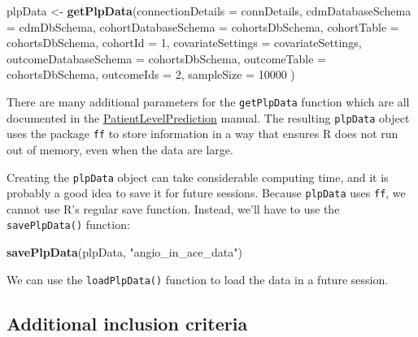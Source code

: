 \documentclass[11pt]{book}
\newenvironment{Shaded}{\begin{snugshade}}{\end{snugshade}}
\newcommand{\KeywordTok}[1]{\textcolor[rgb]{0.13,0.29,0.53}{\textbf{#1}}}
\newcommand{\DataTypeTok}[1]{\textcolor[rgb]{0.13,0.29,0.53}{#1}}
\newcommand{\DecValTok}[1]{\textcolor[rgb]{0.00,0.00,0.81}{#1}}
\newcommand{\StringTok}[1]{\textcolor[rgb]{0.31,0.60,0.02}{#1}}
\newcommand{\NormalTok}[1]{#1}
\begin{document}
\begin{Shaded}
\begin{Highlighting}[]
\NormalTok{plpData <-}\StringTok{ }\KeywordTok{getPlpData}\NormalTok{(}\DataTypeTok{connectionDetails =}\NormalTok{ connDetails,}
                      \DataTypeTok{cdmDatabaseSchema =}\NormalTok{ cdmDbSchema,}
                      \DataTypeTok{cohortDatabaseSchema =}\NormalTok{ cohortsDbSchema,}
                      \DataTypeTok{cohortTable =}\NormalTok{ cohortsDbSchema,}
                      \DataTypeTok{cohortId =} \DecValTok{1}\NormalTok{,}
                      \DataTypeTok{covariateSettings =}\NormalTok{ covariateSettings,}
                      \DataTypeTok{outcomeDatabaseSchema =}\NormalTok{ cohortsDbSchema,}
                      \DataTypeTok{outcomeTable =}\NormalTok{ cohortsDbSchema,}
                      \DataTypeTok{outcomeIds =} \DecValTok{2}\NormalTok{,}
                      \DataTypeTok{sampleSize =} \DecValTok{10000}
\NormalTok{)}
\end{Highlighting}
\end{Shaded}

There are many additional parameters for the \texttt{getPlpData}
function which are all documented in the
\href{https://ohdsi.github.io/PatientLevelPrediction/}{PatientLevelPrediction}
manual. The resulting \texttt{plpData} object uses the package
\texttt{ff} to store information in a way that ensures R does not run
out of memory, even when the data are large.

Creating the \texttt{plpData} object can take considerable computing
time, and it is probably a good idea to save it for future sessions.
Because \texttt{plpData} uses \texttt{ff}, we cannot use R's regular
save function. Instead, we'll have to use the \texttt{savePlpData()}
function:

\begin{Shaded}
\begin{Highlighting}[]
\KeywordTok{savePlpData}\NormalTok{(plpData, }\StringTok{"angio_in_ace_data"}\NormalTok{)}
\end{Highlighting}
\end{Shaded}

We can use the \texttt{loadPlpData()} function to load the data in a
future session.

\subsection{Additional inclusion
criteria}\label{additional-inclusion-criteria}
\end{document}
